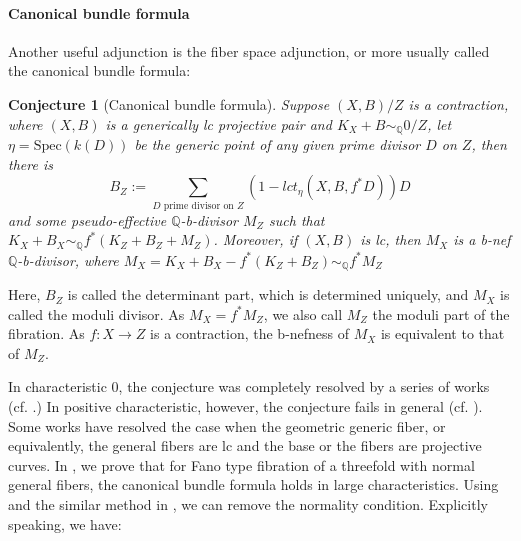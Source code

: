 \documentclass[letterpaper,reqno,12pt]{amsart}
\newcommand{\tbf}{\textbf}
\numberwithin{equation}{section}
\theoremstyle{plain}
\newtheorem{conjecture}[theorem]{Conjecture}
\begin{document}
\paragraph{\tbf{Canonical bundle formula}}
Another useful adjunction is the fiber space adjunction, or more usually called the canonical bundle formula:
\begin{conjecture}[Canonical bundle formula]
\label{cbff}
    Suppose $(X,B)/Z$ is a contraction, where $(X,B)$ is a generically lc projective pair and $K_X+B\sim_{\mathbb Q} 0/Z$, let $\eta=\text{Spec}(k(D))$ be the generic point of any given prime divisor $D$ on $Z$, then there is 
    \[B_Z:=\sum\limits_{D\text{ prime divisor on }Z}(1-lct_\eta(X,B,f^*D))D\]
     and some pseudo-effective ${\mathbb Q}$-b-divisor $M_Z$ such that $K_X+B_X\sim_{\mathbb Q} f^*(K_Z+B_Z+M_Z)$. Moreover, if $(X,B)$ is lc, then $M_X$ is a b-nef ${\mathbb Q}$-b-divisor, where $M_X=K_X+B_X-f^*(K_Z+B_Z)\sim_{\mathbb Q}f^*M_Z$
\end{conjecture}
Here, $B_Z$ is called the determinant part, which is determined uniquely, and $M_X$ is called the moduli divisor. As $M_X=f^*M_Z$, we also call $M_Z$ the moduli part of the fibration. As $f:X\to Z$ is a contraction, the b-nefness of $M_X$ is equivalent to that of $M_Z$. 

In characteristic $0$, the conjecture was completely resolved by a series of works (cf.\cite{Kawamata1997SubadjunctionOL} \cite{Ambro_2005}\cite{2021arXivpositivityofmoduli}\cite{FilsemiampleModulipart}\cite{JLX22}\cite{CHLX23}.) In positive characteristic, however, the conjecture fails in general (cf. \cite[3.5]{Witaszek2017OnTC}).  Some works \cite{Witaszek2017OnTC}\cite{benozzocanonicalbundleformula} have resolved the case when the geometric generic fiber, or equivalently, the general fibers are lc and the base or the fibers are projective curves. In \cite{jxtcbf}, we prove that for Fano type fibration of a threefold with normal general fibers, the canonical bundle formula holds in large characteristics. Using  and the similar method in \cite{jxtcbf}, we can remove the normality condition. Explicitly speaking, we have:
\end{document}
